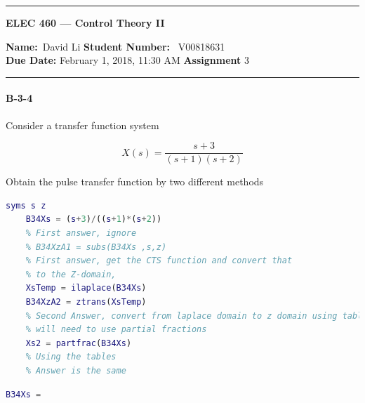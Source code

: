 
\begin{center}
	\hrule
	\vspace{.4cm}
	{\textbf { \large ELEC 460 --- Control Theory II}}
\end{center}
{\textbf{Name:}\ David Li \hspace{\fill} \textbf{Student Number:} \ V00818631  \\
{\textbf{Due Date:} February 1, 2018, 11:30 AM \hspace{\fill} \textbf{Assignment}  3}\\
\hrule

    
    
%


\paragraph{B-3-4}

Consider a transfer function system

$$ X(s)=\frac{s+3}{(s+1)(s+2)}$$

Obtain the pulse transfer function by two different methods

\begin{lstlisting}[language=Matlab,caption=Matlab Code for B-2-17]
	syms s z
	B34Xs = (s+3)/((s+1)*(s+2))
	% First answer, ignore
	% B34XzA1 = subs(B34Xs ,s,z)
	% First answer, get the CTS function and convert that
	% to the Z-domain,
	XsTemp = ilaplace(B34Xs)
	B34XzA2 = ztrans(XsTemp)
	% Second Answer, convert from laplace domain to z domain using tables
	% will need to use partial fractions
	Xs2 = partfrac(B34Xs)
	% Using the tables
	% Answer is the same
\end{lstlisting}

\begin{lstlisting}[language=Matlab,caption=Matlab Code for B-2-17]
B34Xs =
 

\end{lstlisting}}
